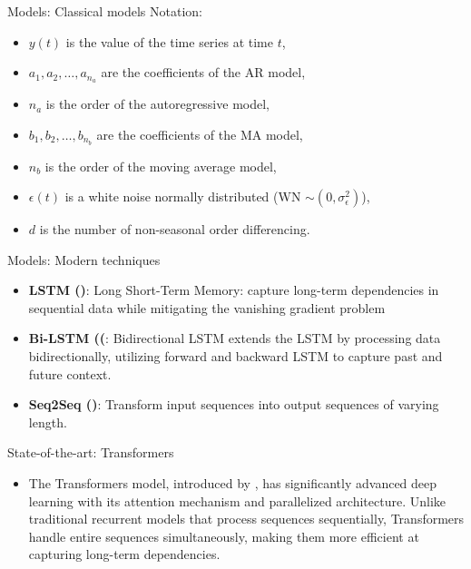 \documentclass[aspectratio=16 9,10pt]{beamer}
\begin{document}
\begin{frame}{Models: Classical models }
Notation:
\begin{itemize}
    \item \( y(t) \) is the value of the time series at time \( t \),
    \item \( a_1, a_2, \dots, a_{n_a} \) are the coefficients of the AR model,
    \item \( n_a \) is the order of the autoregressive model,
    \item \( b_1, b_2, \dots, b_{n_b} \) are the coefficients of the MA model,
    \item \( n_b \) is the order of the moving average model,
    \item \( \epsilon(t) \) is a white noise normally distributed (WN $\sim (0, \sigma_\epsilon^2)$),
    \item \( d \) is the number of non-seasonal order differencing.
\end{itemize}
\end{frame}


\begin{frame}{Models: Modern techniques}
\begin{itemize}
     \item \textbf{LSTM (\cite{hochreiter1997lstm})}: Long Short-Term Memory: capture long-term dependencies in sequential data while mitigating the vanishing gradient problem 
     \item \textbf{Bi-LSTM (\cite{graves2005framewise}(}: Bidirectional LSTM extends the LSTM by processing data bidirectionally, utilizing forward and backward LSTM to capture past and future context.
     \item \textbf{Seq2Seq (\cite{sutskever2014seq2seq})}: Transform input sequences into output sequences of varying length.
\end{itemize}
\end{frame}

\begin{frame}{State-of-the-art: Transformers}
\begin{itemize}
     \item The Transformers model, introduced by \cite{vaswani2017attention}, has significantly advanced deep learning with its attention mechanism and parallelized architecture. Unlike traditional recurrent models that process sequences sequentially, Transformers handle entire sequences simultaneously, making them more efficient at capturing long-term dependencies.

\end{itemize}
\end{frame}
\end{document}

